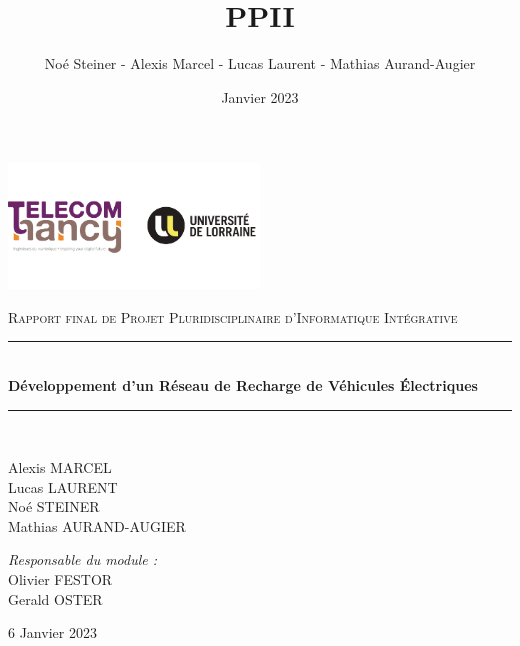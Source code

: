 \documentclass[french,a4paper]{article}
\title{PPII}
\author{Noé Steiner - Alexis Marcel - Lucas Laurent - Mathias Aurand-Augier}
\date{Janvier 2023}
\newcommand{\HRule}{\rule{\linewidth}{0.5mm}}
\begin{document}

\begin{titlepage}
    \begin{center}

        \includegraphics[width=0.5\textwidth]{tele_univ.png}

        \textsc{\Large Rapport final de Projet Pluridisciplinaire d'Informatique Intégrative}\\[1.5cm]

        \HRule \\[0.4cm]
        { \huge \bfseries Développement d'un Réseau de Recharge de Véhicules Électriques\\[0.4cm] }

        \HRule \\[2cm]

        \begin{minipage}{0.4\textwidth}
            \begin{flushleft} \large
                Alexis MARCEL\\
                Lucas LAURENT\\
                Noé STEINER\\
                Mathias AURAND-AUGIER\\
            \end{flushleft}
        \end{minipage}
        \begin{minipage}{0.4\textwidth}
            \begin{flushright} \large
                \emph{Responsable du module :}\\
                Olivier FESTOR\\
                Gerald OSTER\\
            \end{flushright}
        \end{minipage}

        \vfill

        {\large 6 Janvier 2023}

    \end{center}
\end{titlepage}
\newpage
\tableofcontents
\newpage
\end{document}
